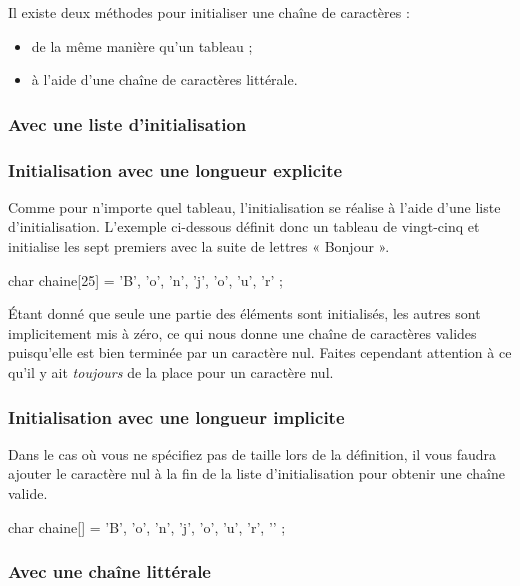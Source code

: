 Il existe deux méthodes pour initialiser une chaîne de caractères :

\begin{itemize}
\item
  de la même manière qu'un tableau ;
\item
  à l'aide d'une chaîne de caractères littérale.
\end{itemize}

\subsubsection{Avec une liste d'initialisation}
\label{avec-une-liste-dinitialisation}

\subsubsection{Initialisation avec une longueur explicite}
\label{initialisation-avec-une-longueur-explicite-3}

Comme pour n'importe quel tableau, l'initialisation se réalise à l'aide
d'une liste d'initialisation. L'exemple ci-dessous définit donc un
tableau de vingt-cinq  et initialise les sept premiers avec
la suite de lettres « Bonjour ».

\begin{C}
char chaine[25] = { 'B', 'o', 'n', 'j', 'o', 'u', 'r' };
\end{C}

Étant donné que seule une partie des éléments sont initialisés, les
autres sont implicitement mis à zéro, ce qui nous donne une chaîne de
caractères valides puisqu'elle est bien terminée par un caractère nul.
Faites cependant attention à ce qu'il y ait \emph{toujours} de la place
pour un caractère nul.

\subsubsection{Initialisation avec une longueur implicite}
\label{initialisation-avec-une-longueur-implicite-3}

Dans le cas où vous ne spécifiez pas de taille lors de la définition, il
vous faudra ajouter le caractère nul à la fin de la liste
d'initialisation pour obtenir une chaîne valide.

\begin{C}
char chaine[] = { 'B', 'o', 'n', 'j', 'o', 'u', 'r', '\0' };
\end{C}

\subsubsection{Avec une chaîne littérale}
\label{avec-une-chaine-litterale}

